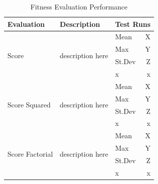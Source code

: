 \documentclass{article}
\begin{document}
\begin{table}[h]
\begin{center}
\begin{tabular}{|l|l|l|r|}
\hline%
\textbf{Evaluation} & \textbf{Description} & \multicolumn{2}{c|}{\textbf{Test Runs}} \\
\hline
\multirow{4}{*}{Score} & \multirow{4}{*}{description here}
& Mean & X \\
&& Max  & Y \\
&& St.Dev & Z \\
&& x    & x \\
\hline
\multirow{4}{*}{Score Squared} & \multirow{4}{*}{description here}
& Mean & X \\
&& Max  & Y \\
&& St.Dev & Z \\
&& x    & x \\
\hline
\multirow{4}{*}{Score Factorial} & \multirow{4}{*}{description here}
& Mean & X \\
&& Max  & Y \\
&& St.Dev & Z \\
&& x    & x \\
\hline
\end{tabular}
\end{center}
\caption{Fitness Evaluation Performance}
\label{table:function_set}
\end{table}
\end{document}
